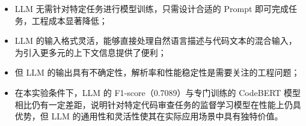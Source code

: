 \documentclass{experimentreport}
\begin{document}
{\begin{itemize}
  \item LLM 无需针对特定任务进行模型训练，只需设计合适的 Prompt 即可完成任务，工程成本显著降低；
  \item LLM 的输入格式灵活，能够直接处理自然语言描述与代码文本的混合输入，为引入更多元的上下文信息提供了便利；
  \item 但 LLM 的输出具有不确定性，解析率和性能稳定性是需要关注的工程问题；
  \item 在本实验条件下，LLM 的 F1-score（0.7089）与专门训练的 CodeBERT 模型相比仍有一定差距，说明针对特定代码审查任务的监督学习模型在性能上仍具优势，但 LLM 的通用性和灵活性使其在实际应用场景中具有独特价值。
\end{itemize}

}






\teachercomment
\end{document}
